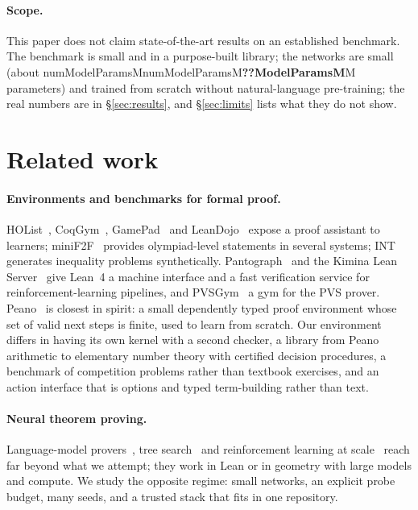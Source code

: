 \documentclass[10pt]{article}
\newcommand{\N}[1]{\ifcsname num#1\endcsname\csname num#1\endcsname\else\textbf{??#1}\fi}          %
\begin{document}
\paragraph{Scope.}
This paper does not claim state-of-the-art results on an established benchmark. The benchmark is small and in a purpose-built library; the networks are small (about \N{ModelParamsM}M parameters) and trained from scratch without natural-language pre-training; the real numbers are in \S\ref{sec:results}, and \S\ref{sec:limits} lists what they do not show.

\section{Related work}\label{sec:related}

\paragraph{Environments and benchmarks for formal proof.}
HOList~\citep{bansal2019holist}, CoqGym~\citep{yang2019coqgym}, GamePad~\citep{huang2019gamepad} and LeanDojo~\citep{yang2023leandojo} expose a proof assistant to learners; miniF2F~\citep{zheng2022minif2f} provides olympiad-level statements in several systems; INT~\citep{wu2021int} generates inequality problems synthetically.
Pantograph~\citep{aniva2024pantograph} and the Kimina Lean Server~\citep{dossantos2025kimina} give Lean~4 a machine interface and a fast verification service for reinforcement-learning pipelines, and PVSGym~\citep{acharya2025pvsgym} a gym for the PVS prover.
Peano~\citep{poesia2023peano} is closest in spirit: a small dependently typed proof environment whose set of valid next steps is finite, used to learn from scratch.
Our environment differs in having its own kernel with a second checker, a library from Peano arithmetic to elementary number theory with certified decision procedures, a benchmark of competition problems rather than textbook exercises, and an action interface that is options and typed term-building rather than text.

\paragraph{Neural theorem proving.}
Language-model provers~\citep{polu2020generative,han2022proof,polu2023formal,xin2024deepseek,ren2025deepseekproverv2,chen2025seedprover}, tree search~\citep{lample2022hypertree,kaliszyk2018reinforcement,loos2017deep} and reinforcement learning at scale~\citep{hubert2025olympiad,trinh2024solving} reach far beyond what we attempt; they work in Lean or in geometry with large models and compute.
We study the opposite regime: small networks, an explicit probe budget, many seeds, and a trusted stack that fits in one repository.
\end{document}
